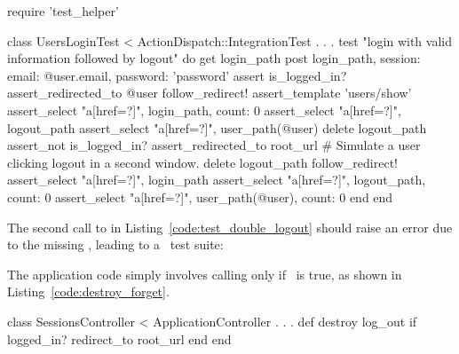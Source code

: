 \begin{codelisting}
\label{code:test_double_logout}
\begin{code}
require 'test_helper'

class UsersLoginTest < ActionDispatch::IntegrationTest
  .
  .
  .
  test "login with valid information followed by logout" do
    get login_path
    post login_path, session: { email: @user.email, password: 'password' }
    assert is_logged_in?
    assert_redirected_to @user
    follow_redirect!
    assert_template 'users/show'
    assert_select "a[href=?]", login_path, count: 0
    assert_select "a[href=?]", logout_path
    assert_select "a[href=?]", user_path(@user)
    delete logout_path
    assert_not is_logged_in?
    assert_redirected_to root_url
    # Simulate a user clicking logout in a second window.
    delete logout_path
    follow_redirect!
    assert_select "a[href=?]", login_path
    assert_select "a[href=?]", logout_path,      count: 0
    assert_select "a[href=?]", user_path(@user), count: 0
  end
end
\end{code}
\end{codelisting}

\noindent The second call to  in Listing~\ref{code:test_double_logout} should raise an error due to the missing , leading to a \failing\ test suite:

\begin{codelisting}
\codecaption{\failing}
\end{codelisting}

The application code simply involves calling  only if \ is true, as shown in Listing~\ref{code:destroy_forget}.

\begin{codelisting}
\label{code:destroy_forget}
\begin{code}
class SessionsController < ApplicationController
  .
  .
  .
  def destroy
    log_out if logged_in?
    redirect_to root_url
  end
end
\end{code}
\end{codelisting}


